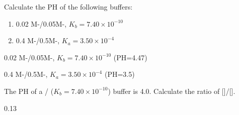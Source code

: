 \documentclass[main.tex]{subfiles}
\begin{document}
\begin{multicols*}{2}
\begin{question}[ID=\the\value{numA}]
Calculate the PH of the following buffers:
\begin{enumerate}[label=(\alph*)]
\item 0.02 M-/0.05M-, $K_b=7.40 \times 10^{-10}$ %
\item 0.4 M-/0.5M-, $K_a=3.50 \times 10^{-4}$ %
 \end{enumerate}
\end{question}
\begin{solution}
\begin{inparaenum}[(a)]
\item 0.02 M-/0.05M-, $K_b=7.40 \times 10^{-10}$   (PH=4.47)
\item 0.4 M-/0.5M-, $K_a=3.50 \times 10^{-4}$   (PH=3.5)
 \end{inparaenum}
\hspace{0.1cm}\end{solution}%


\begin{question}[ID=\the\value{numA}]
The PH of a  / ($K_b=7.40 \times 10^{-10}$) buffer is 4.0. Calculate the ratio of []/[].
\end{question}
\begin{solution}
0.13
\hspace{0.1cm}\end{solution}%



\end{multicols*}
\end{document}
